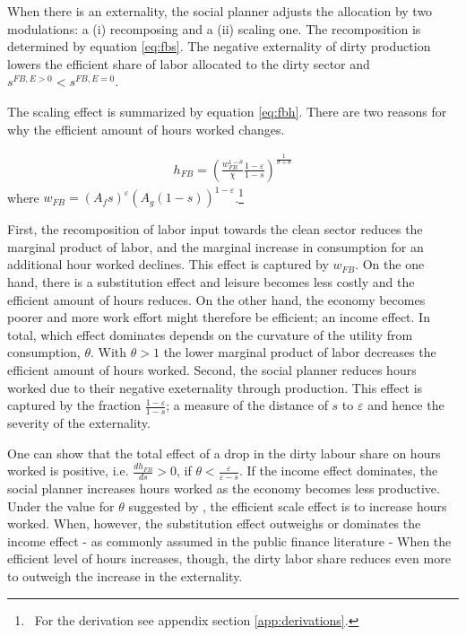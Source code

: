 When there is an externality, the social planner adjusts the allocation by two modulations: a (i) recomposing and a (ii) scaling one. 
The recomposition is determined by equation \ref{eq:fbs}. The negative externality of dirty production lowers the efficient share of labor allocated to  the dirty sector and $s^{FB,E>0}<s^{FB,E=0}$. 

The scaling effect is summarized by equation \ref{eq:fbh}. There are two reasons for why the efficient amount of hours worked changes. 

\begin{align}
h_{FB}= \left(\frac{w_{FB}^{1-\theta}}{\chi}\frac{1-\varepsilon}{1-s}\right)^\frac{1}{\sigma+\theta}\label{eq:heff}
\end{align}
where $w_{FB}=(A_f s)^{\varepsilon}(A_g(1-s))^{1-\varepsilon}$.\footnote{\ For the derivation see appendix section \ref{app:derivations}.}


First, the recomposition of labor input towards the  clean sector reduces the marginal product of labor, and the marginal increase in consumption for an additional hour worked declines.  This effect is captured by $w_{FB}$. On the one hand, there is a substitution effect and leisure becomes less costly and the efficient amount of hours reduces. On the other hand, the economy becomes poorer and more work effort might therefore be efficient; an income effect. In total, which effect dominates depends on the curvature of the utility from consumption, $\theta$. With $\theta>1$ the  lower marginal product of labor decreases the efficient amount of hours worked. 
Second, the social planner reduces hours worked due to their negative exeternality through production. This effect is captured by the fraction $\frac{1-\varepsilon}{1-s}$; a measure of the distance of $s$ to $\varepsilon$ and hence the severity of the externality. 

One can show that the total effect of a drop in the dirty labour share on hours worked is positive, i.e. $\frac{dh_{FB}}{ds}>0$, if $\theta<\frac{\varepsilon}{\varepsilon-s}$. If the income effect dominates, the social planner increases hours worked as the economy becomes less productive. 
Under the value for $\theta$ suggested by \cite{Boppart2019LaborPerspectiveb}, the efficient scale effect is to increase hours worked. When, however, the substitution effect outweighs or dominates the income effect - as commonly assumed in the public finance literature \citep{Heathcote2017OptimalFramework, LansBovenberg1994EnvironmentalTaxation, LansBovenberg1996OptimalAnalyses} - 
When the efficient level of hours increases, though, the dirty labor share reduces even more to outweigh the increase in the externality.

